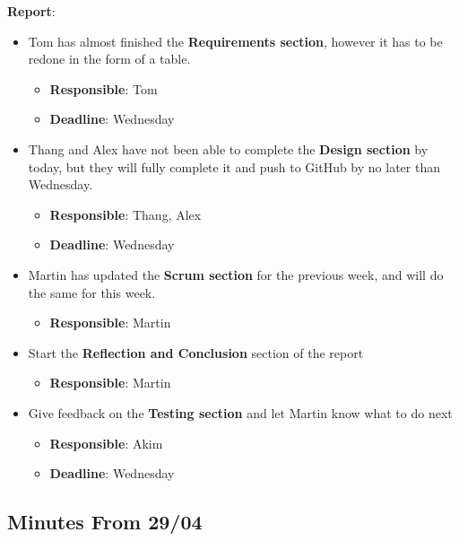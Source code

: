 \documentclass[11pt]{article}
\begin{document}
\textbf{Report}:

\begin{itemize}
\tightlist
\item
  Tom has almost finished the \textbf{Requirements section}, however it
  has to be redone in the form of a table.

  \begin{itemize}
  \tightlist
  \item
    \textbf{Responsible}: Tom
  \item
    \textbf{Deadline}: Wednesday
  \end{itemize}
  \newpage
\item
  Thang and Alex have not been able to complete the \textbf{Design
  section} by today, but they will fully complete it and push to GitHub
  by no later than Wednesday.

  \begin{itemize}
  \tightlist
  \item
    \textbf{Responsible}: Thang, Alex
  \item
    \textbf{Deadline}: Wednesday
  \end{itemize}
\item
  Martin has updated the \textbf{Scrum section} for the previous week,
  and will do the same for this week.

  \begin{itemize}
  \tightlist
  \item
    \textbf{Responsible}: Martin
  \end{itemize}
\item
  Start the \textbf{Reflection and Conclusion} section of the report

  \begin{itemize}
  \tightlist
  \item
    \textbf{Responsible}: Martin
  \end{itemize}
\item
  Give feedback on the \textbf{Testing section} and let Martin know what
  to do next

  \begin{itemize}
  \tightlist
  \item
    \textbf{Responsible}: Akim
  \item
    \textbf{Deadline}: Wednesday
  \end{itemize}
\end{itemize}

\hypertarget{minutes-from-2904}{%
\subsection{Minutes From 29/04}\label{minutes-from-2904}}
\end{document}
